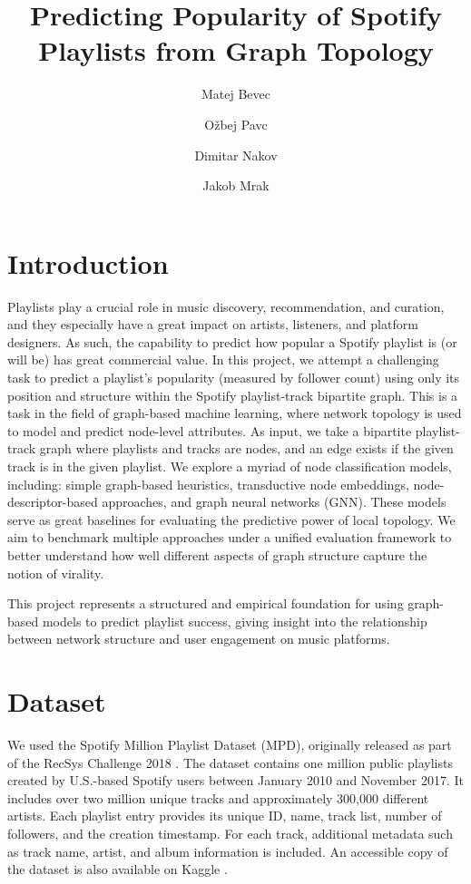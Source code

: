 \documentclass[9pt,twocolumn,twoside]{pnas-report}
\title{Predicting Popularity of Spotify Playlists from Graph Topology}
\author[a]{Matej Bevec}
\author[a]{Ožbej Pavc}
\author[a]{Dimitar Nakov}
\author[a]{Jakob Mrak}
\affil[a]{University of Ljubljana, Faculty of Computer and Information Science, Ve\v{c}na pot 113, SI-1000 Ljubljana, Slovenia}
\begin{document}
\maketitle
\thispagestyle{firststyle}

\section*{Introduction}
Playlists play a crucial role in music discovery, recommendation, and curation, and they especially have a great impact on artists, listeners, and platform designers. As such, the capability to predict how popular a Spotify playlist is (or will be) has great commercial value. 
In this project, we attempt a challenging task to predict a playlist's popularity (measured by follower count) using only its position and structure within the Spotify playlist-track bipartite graph.
This is a task in the field of graph-based machine learning, where network topology is used to model and predict node-level attributes. As input, we take a bipartite playlist-track graph where playlists and tracks are nodes, and an edge exists if the given track is in the given playlist.
We explore a myriad of node classification models, including: simple graph-based heuristics, transductive node embeddings, node-descriptor-based approaches, and graph neural networks (GNN). These models serve as great baselines for evaluating the predictive power of local topology. We aim to benchmark multiple approaches under a unified evaluation framework to better understand how well different aspects of graph structure capture the notion of virality.

This project represents a structured and empirical foundation for using graph-based models to predict playlist success, giving insight into the relationship between network structure and user engagement on music platforms.

\section{Dataset}
We used the Spotify Million Playlist Dataset (MPD), originally released as part of the RecSys Challenge 2018 \cite{aicrowd}. The dataset contains one million public playlists created by U.S.-based Spotify users between January 2010 and November 2017. It includes over two million unique tracks and approximately 300,000 different artists. Each playlist entry provides its unique ID, name, track list, number of followers, and the creation timestamp. For each track, additional metadata such as track name, artist, and album information is included. An accessible copy of the dataset is also available on Kaggle \cite{kaggle}.
\end{document}
